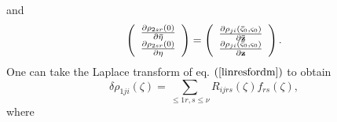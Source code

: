 \documentclass[aps,preprint]{revtex4}%
\begin{document}
and
\begin{equation}
\left(
\begin{array}
[c]{c}%
\frac{\partial\rho_{2sr}\left(  0\right)  }{\partial\mathbf{\bar{\eta}}}\\
\frac{\partial\rho_{2sr}\left(  0\right)  }{\partial\mathbf{\eta}}%
\end{array}
\right)  =\left(
\begin{array}
[c]{c}%
\frac{\partial\rho_{ji}\left(  \mathbf{\bar{\varsigma}}_{0},\mathbf{\varsigma
}_{0}\right)  }{\partial\mathbf{\bar{z}}}\\
\frac{\partial\rho_{ji}\left(  \mathbf{\bar{\varsigma}}_{0},\mathbf{\varsigma
}_{0}\right)  }{\partial\mathbf{z}}%
\end{array}
\right)  .
\end{equation}
One can take the Laplace transform of eq. $\left(  \ref{linresfordm}\right)  $
to obtain
\begin{equation}
\delta\rho_{1ji}\left(  \zeta\right)  =\sum_{\leq1r,s\leq\nu}R_{ijrs}\left(
\zeta\right)  f_{rs}\left(  \zeta\right)  ,
\end{equation}
where
\end{document}
